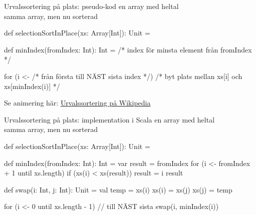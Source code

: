 \begin{Slide}{Urvalssortering på plats: pseudo-kod}
 en array med heltal\\
 samma array, men nu sorterad\\

\begin{Code}
def selectionSortInPlace(xs: Array[Int]): Unit = {
  def minIndex(fromIndex: Int): Int = {
    /* index för minsta element från fromIndex  */
  }
  
  for (i <- /* från första till NÄST sista index */) { 
    /* byt plats mellan xs[i] och xs[minIndex(i)] */      
  }
}
\end{Code}
\pause
Se animering här: \href{https://sv.wikipedia.org/wiki/Urvalssortering}{Urvalssortering på Wikipedia}
\end{Slide}

\begin{Slide}{Urvalssortering på plats: implementation i Scala}\SlideFontSmall
\vspace{-0.25em}
 en array med heltal\\
 samma array, men nu sorterad\\

\begin{Code}[numberstyle=\ttfamily\SlideFontSize{6}{7.5},numbers=left]
def selectionSortInPlace(xs: Array[Int]): Unit = {
  def minIndex(fromIndex: Int): Int = {
    var result = fromIndex
    for (i <- fromIndex + 1 until xs.length) {
      if (xs(i) < xs(result)) result = i
    }
    result
  }
  
  def swap(i: Int, j: Int): Unit = {
    val temp = xs(i)
    xs(i) = xs(j)
    xs(j) = temp
  }
  
  for (i <- 0 until xs.length - 1) { // till NÄST sista
    swap(i, minIndex(i))      
  }
}
\end{Code}
\end{Slide}

